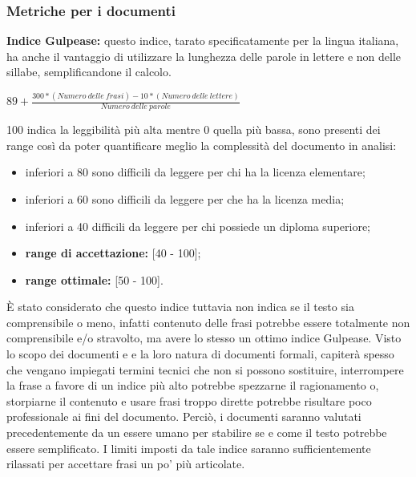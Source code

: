 		\subsubsection{Metriche per i documenti}
		\textbf{Indice Gulpease:} questo indice, tarato specificatamente per la lingua italiana, ha anche il vantaggio di utilizzare la lunghezza delle parole in lettere e non delle sillabe, semplificandone il calcolo.
			\begin{center}
				\begin{math}
					89+\frac{300 * (Numero\ delle\ frasi) - 10 * (Numero\ delle\ lettere)}{Numero\ delle\ parole}
				\end{math}
			\end{center}
		100 indica la leggibilità più alta mentre 0 quella più bassa, sono presenti dei range così da poter quantificare meglio la complessità del documento in analisi:
			\begin{itemize}
				\item inferiori a 80 sono difficili da leggere per chi ha la licenza elementare;
				\item inferiori a 60 sono difficili da leggere per che ha la licenza media;
				\item inferiori a 40 difficili da leggere per chi possiede un diploma superiore;
			\end{itemize}
			\begin{itemize}
					\item \textbf{range di accettazione:} [40 - 100];
					\item \textbf{range ottimale:} [50 - 100].
			\end{itemize}

È stato considerato che questo indice tuttavia non indica se il testo sia comprensibile o meno, infatti contenuto delle frasi potrebbe essere totalmente non comprensibile e/o stravolto, ma
avere lo stesso un ottimo indice Gulpease. Visto lo scopo dei documenti e e la loro natura di documenti formali, capiterà spesso che vengano impiegati termini tecnici che non si possono sostituire, interrompere la frase a favore di un indice più alto potrebbe spezzarne il ragionamento o, storpiarne il contenuto e usare frasi troppo dirette potrebbe risultare poco professionale ai fini del documento. Perciò, i documenti saranno valutati precedentemente da un essere umano per stabilire se e come il testo potrebbe essere semplificato. I limiti imposti da tale indice saranno sufficientemente rilassati per accettare frasi un po' più articolate.
